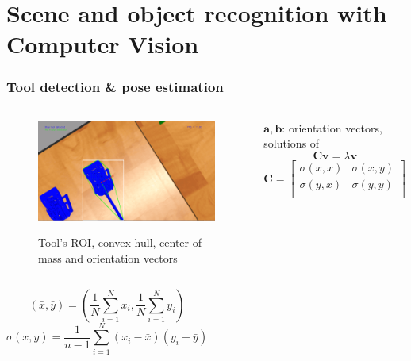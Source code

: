 \section{Scene and object recognition with Computer Vision}

\begin{frame}
\frametitle{Tool detection \& pose estimation}
\begin{columns}
\begin{center}
\begin{figure}[!htb]
\centering
\includegraphics[width=\textwidth]{../images/tool-pose.png}\\
\caption{Tool's ROI, convex hull, center of mass and orientation vectors}
\end{figure}

\end{center}


$\mathbf{a},\mathbf{b}$: orientation vectors, solutions of
\[
\mathbf{C} \mathbf{v} = λ \mathbf{v}
\]
\[
\mathbf{C} = \begin{bmatrix}
σ(x,x) & σ(x,y) \\
σ(y,x) & σ(y,y) \\
\end{bmatrix}
\]
\end{columns}

\begin{columns}
\[
\left( \bar{x}, \bar{y} \right) = \left( \frac{1}{N}\sum_{i=1}^{N} x_i , \frac{1}{N}\sum_{i=1}^{N} y_i \right)
\]
\[
σ(x,y) = \frac{1}{n-1} \sum_{i=1}^{N} ( x_i - \bar{x} )( y_i - \bar{y} )
\]
\end{columns}
\end{frame}



